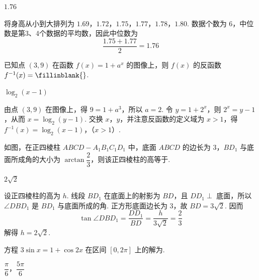 \begin{answer}
\(1.76\)
\end{answer}

\begin{solution}
将身高从小到大排列为 \(1.69\)，\(1.72\)，\(1.75\)，\(1.77\)，\(1.78\)，\(1.80\). 数据个数为 \(6\)，中位数是第3、4个数据的平均数，因此中位数为
\[
\frac{1.75+1.77}{2}=1.76
\]
\end{solution}

\begin{problem}
已知点 \((3,9)\) 在函数 \(f(x)=1+a^x\) 的图像上，则 \(f(x)\) 的反函数 \(f^{-1}(x)=\fillinblank{}\).
\end{problem}

\begin{answer}
\(\log_2(x-1)\)
\end{answer}

\begin{solution}
由点 \((3,9)\) 在图像上，得 \(9=1+a^3\)，所以 \(a=2\). 令 \(y=1+2^x\)，则 \(2^x=y-1\)，从而 \(x=\log_2(y-1)\). 交换 \(x\)，\(y\)，并注意反函数的定义域为 \(x>1\)，得
\(f^{-1}(x)=\log_2(x-1)\)，（\(x>1\)）.
\end{solution}

\begin{problem}
如图，在正四棱柱 \(ABCD-A_1B_1C_1D_1\) 中，底面 \(ABCD\) 的边长为 \(3\)，\(BD_1\) 与底面所成角的大小为 \(\arctan\dfrac23\)，则该正四棱柱的高等于\fillinblank{}.

\end{problem}

\begin{answer}
\(2\sqrt2\)
\end{answer}

\begin{solution}
设正四棱柱的高为 \(h\). 线段 \(BD_1\) 在底面上的射影为 \(BD\)，且 \(DD_1\perp\) 底面，所以 \(\angle DBD_1\) 是 \(BD_1\) 与底面所成的角. 正方形底面边长为 \(3\)，故 \(BD=3\sqrt2\). 因而
\[
\tan\angle DBD_1=\frac{DD_1}{BD}=\frac{h}{3\sqrt2}=\frac23
\]
解得 \(h=2\sqrt2\).
\end{solution}

\begin{problem}
方程 \(3\sin x=1+\cos2x\) 在区间 \([0,2\pi]\) 上的解为\fillinblank{}.
\end{problem}

\begin{answer}
\(\dfrac{\pi}{6}\)，\(\dfrac{5\pi}{6}\)
\end{answer}

